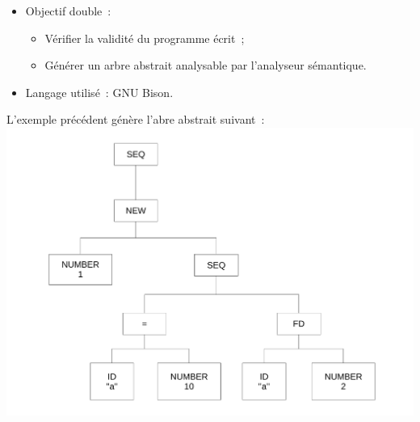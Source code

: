 \begin{frame}
	\begin{itemize}
	\item Objectif double~: 
		\begin{itemize}
		\item Vérifier la validité du programme écrit~;
		\item Générer un arbre abstrait analysable par l'analyseur sémantique.
		\end{itemize}
	\item Langage utilisé~: GNU Bison.
	\end{itemize}
\end{frame}

\begin{frame}
L'exemple précédent génère l'abre abstrait suivant~:
\includegraphics[scale=0.3]{doc/Presentation/img/arbre.pdf}
\end{frame}

